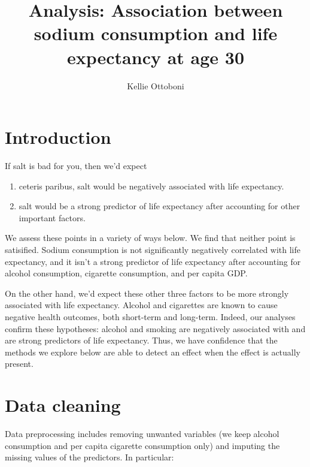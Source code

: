 \documentclass[11pt]{article}\usepackage[]{graphicx}\usepackage[]{color}
\title{Analysis: Association between sodium consumption and life expectancy at age 30}
\author{Kellie Ottoboni}
\begin{document}
\maketitle




\section{Introduction}
If salt is bad for you, then we'd expect 
\begin{enumerate}
\item ceteris paribus, salt would be negatively associated with life expectancy.
\item salt would be a strong predictor of life expectancy after accounting for other important factors.
\end{enumerate}
We assess these points in a variety of ways below.
We find that neither point is satisified.
Sodium consumption is not significantly negatively correlated with life expectancy, and it isn't a strong predictor of life expectancy after accounting for alcohol consumption, cigarette consumption, and per capita GDP.

On the other hand, we'd expect these other three factors to be more strongly associated with life expectancy.
Alcohol and cigarettes are known to cause negative health outcomes, both short-term and long-term.
Indeed, our analyses confirm these hypotheses: alcohol and smoking are negatively associated with and are strong predictors of life expectancy.
Thus, we have confidence that the methods we explore below are able to detect an effect when the effect is actually present.


\section{Data cleaning}

Data preprocessing includes removing unwanted variables (we keep alcohol consumption and per capita cigarette consumption only) and imputing the missing values of the predictors. In particular:
\end{document}
